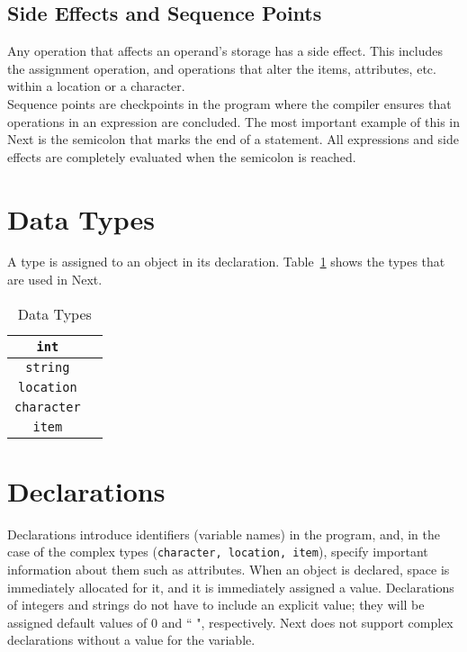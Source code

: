 \documentclass[12pt]{article}
\begin{document}
\subsection{Side Effects and Sequence Points}
Any operation that affects an operand's storage has a side effect.  This includes the assignment operation, and operations that alter the items, attributes, etc. within a location or a character. \\

\noindent Sequence points are checkpoints in the program where the compiler ensures that operations in an expression are concluded.  The most important example of this in Next is the semicolon that marks the end of a statement.  All expressions and side effects are completely evaluated when the semicolon is reached.


\section{Data Types}
A type is assigned to an object in its declaration.  Table~\ref{types} shows the types that are used in Next.

\begin{table}[htdp]
\caption{Data Types}
\begin{center}
\begin{tabular}{|c|c|}
\hline
\texttt{int} \\
\hline
\texttt{string} \\
\hline
\texttt{location} \\
\hline
\texttt{character} \\
\hline
\texttt{item} \\
\hline
\end{tabular}
\end{center}
\label{types}
\end{table}%

\section{Declarations}
Declarations introduce identifiers (variable names) in the program, and, in the case of the complex types (\texttt{character, location, item}), specify important information about them such as attributes.  When an object is declared, space is immediately allocated for it, and it is immediately assigned a value.  Declarations of integers and strings do not have to include an explicit value; they will be assigned default values of 0 and `` ", respectively.  Next does not support complex declarations without a value for the variable.
\end{document}
